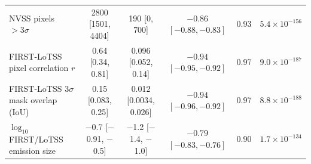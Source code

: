 \begin{table}
\begin{tabular}{lccccc}
NVSS pixels $>3\sigma$ & 2800 [1501, 4404] & 190 [0, 700] & $-0.86$ $[-0.88, -0.83]$ & 0.93 & $5.4\times10^{-156}$ \\
FIRST-LoTSS pixel correlation $r$ & 0.64 [0.34, 0.81] & 0.096 [0.052, 0.14] & $-0.94$ $[-0.95, -0.92]$ & 0.97 & $9.0\times10^{-187}$ \\
FIRST-LoTSS $3\sigma$ mask overlap (IoU) & 0.15 [0.083, 0.25] & 0.012 [0.0034, 0.026] & $-0.94$ $[-0.96, -0.92]$ & 0.97 & $8.8\times10^{-188}$ \\
$\log_{10}$ FIRST/LoTSS emission size & $-$0.7 [$-$0.91, $-$0.5] & $-$1.2 [$-$1.4, $-$1.0] & $-0.79$ $[-0.83, -0.76]$ & 0.90 & $1.7\times10^{-134}$ \\
\hline
\end{tabular}
\end{table}